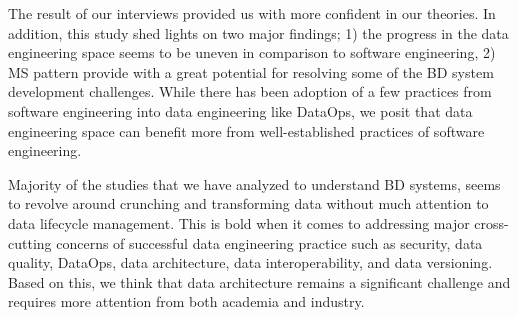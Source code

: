 \documentclass[a4paper,11pt,article,oneside]{memoir}
\begin{document}


The result of our interviews provided us with more confident in our theories. In addition, this study shed lights on two major findings; 1) the progress in the data engineering space seems to be uneven in comparison to software engineering, 2) MS pattern provide with a great potential for resolving some of the BD system development challenges. While there has been adoption of a few practices from software engineering into data engineering like DataOps, we posit that data engineering space can benefit more from well-established practices of software engineering. 

Majority of the studies that we have analyzed to understand BD systems, seems to revolve around crunching and transforming data without much attention to data lifecycle management. This is bold when it comes to addressing major cross-cutting concerns of successful data engineering practice such as security, data quality, DataOps, data architecture, data interoperability, and data versioning. Based on this, we think that data architecture remains a significant challenge and requires more attention from both academia and industry. 

\end{document}
